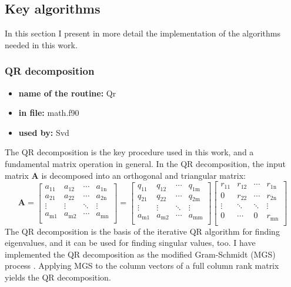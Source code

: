 \documentclass[12pt,a4paper]{article}
\newcommand{\mat}[1]{\mathbf{#1}}
\begin{document}
\subsection{Key algorithms}

In this section I present in more detail the implementation of the algorithms needed in this work.

\subsubsection{QR decomposition}
\begin{itemize}
  \setlength\itemsep{0.1cm}
 \item \textbf{name of the routine:} Qr
 \item \textbf{in file:} math.f90
 \item \textbf{used by:} Svd
\end{itemize}
The QR decomposition is the key procedure used in this work, and a 
fundamental matrix operation in general.
In the QR decomposition, the input matrix $\mat{A}$ is decomposed
into an orthogonal and triangular matrix:
\begin{equation}
\mat{A} =
\begin{bmatrix}
a_{11}   & a_{12}   & \cdots           & a_{1\mathrm{n}} \\
a_{21}   & a_{22}   & \cdots           & a_{2\mathrm{n}}\\
\vdots   & \vdots   & \ddots           & \vdots    \\
a_{\mathrm{m}1}     & a_{\mathrm{m}2} & \cdots  & a_{\mathrm{m}\mathrm{n}}  \\
\end{bmatrix}=
\begin{bmatrix}
q_{11}   & q_{12}   & \cdots           & q_{1\mathrm{m}} \\
q_{21}   & q_{22}   & \cdots           & q_{2\mathrm{m}}\\
\vdots   & \vdots   & \ddots           & \vdots    \\
a_{\mathrm{m}1}     & a_{\mathrm{m}2} & \cdots  & a_{\mathrm{m}\mathrm{m}}  \\
\end{bmatrix}
\begin{bmatrix}
r_{11}   & r_{12}   & \cdots           & r_{1\mathrm{n}} \\
0   & r_{22}   & \cdots           & r_{2\mathrm{n}}\\
\vdots   & \ddots   & \ddots           & \vdots    \\
0     & \cdots & 0  & r_{\mathrm{m}\mathrm{n}}  \\
\end{bmatrix}
\end{equation}
The QR decomposition is the basis of the iterative QR algorithm for finding eigenvalues, and
it can be used for finding singular values, too.
I have implemented the QR decomposition as the modified Gram-Schmidt (MGS) process \citep{Golub}. Applying MGS to
the column vectors of a full column rank matrix yields the QR decomposition.
\end{document}
